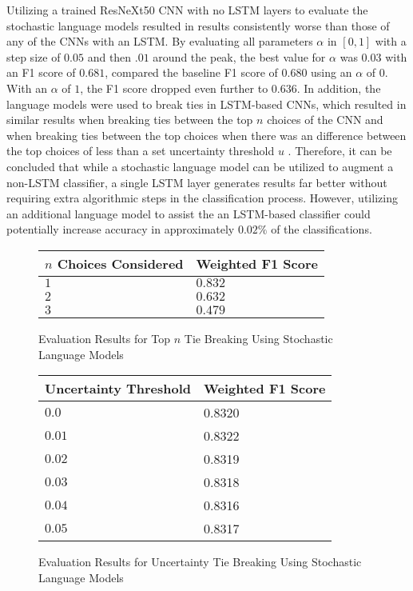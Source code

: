 Utilizing a trained ResNeXt50 CNN with no LSTM layers to evaluate the stochastic language models resulted in results consistently worse than those of any of the CNNs with an LSTM. By evaluating all parameters $\alpha$ in $[0,1]$ with a step size of $0.05$ and then $.01$ around the peak, the best value for $\alpha$ was $0.03$ with an F1 score of $0.681$, compared the baseline F1 score of $0.680$ using an $\alpha$ of $0$. With an $\alpha$ of $1$, the F1 score dropped even further to $0.636$. In addition, the language models were used to break ties in LSTM-based CNNs, which resulted in similar results when breaking ties between the top $n$ choices of the CNN  and when breaking ties between the top choices when there was an difference between the top choices of less than a set uncertainty threshold $u$ . Therefore, it can be concluded that while a stochastic language model can be utilized to augment a non-LSTM classifier, a single LSTM layer generates results far better without requiring extra algorithmic steps in the classification process. However, utilizing an additional language model to assist the an LSTM-based classifier could potentially increase accuracy in approximately $0.02\%$ of the classifications.

\begin{figure}[H]
    \caption{Evaluation Results for Top $n$ Tie Breaking Using Stochastic Language Models}
    \label{fig:classificationMarkovTopN}
    \centering
    \begin{tabular}{ | l | l | }
        \hline
        $n$ Choices Considered & Weighted F1 Score \\
        \hline
        $1$ & $0.832$ \\
        $2$ & $0.632$ \\
        $3$ & $0.479$ \\
        \hline
    \end{tabular}
\end{figure}

\begin{figure}[H]
    \caption{Evaluation Results for Uncertainty Tie Breaking Using Stochastic Language Models}
    \label{fig:classificationMarkovUncertainty}
    \centering
    \begin{tabular}{ | l | l | }
        \hline
        Uncertainty Threshold & Weighted F1 Score \\
        \hline
        $0.0$ & 0.8320 \\
        $0.01$ & 0.8322 \\
        $0.02$ & 0.8319 \\
        $0.03$ & 0.8318 \\
        $0.04$ & 0.8316 \\
        $0.05$ & 0.8317 \\
        \hline
    \end{tabular}
\end{figure}

